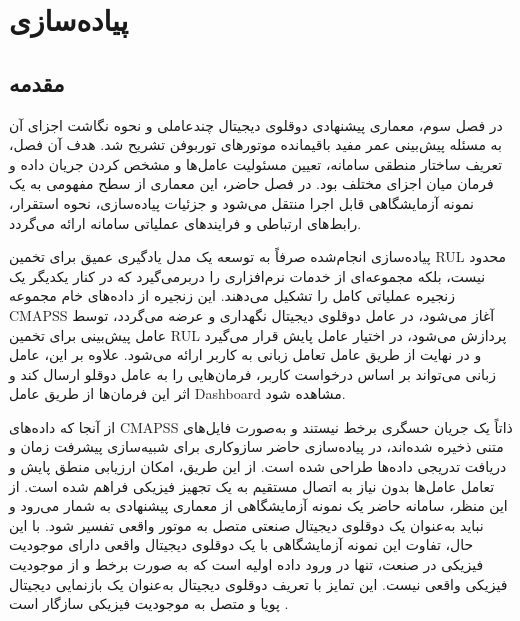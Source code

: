 
\chapter{پیاده‌سازی}\label{chap:impl}

\section{مقدمه}

در فصل سوم، معماری پیشنهادی دوقلوی دیجیتال چندعاملی و نحوه نگاشت اجزای آن به مسئله پیش‌بینی عمر مفید باقیمانده موتورهای توربوفن تشریح شد. هدف آن فصل، تعریف ساختار منطقی سامانه، تعیین مسئولیت عامل‌ها و مشخص کردن جریان داده و فرمان میان اجزای مختلف بود. در فصل حاضر، این معماری از سطح مفهومی به یک نمونه آزمایشگاهی قابل اجرا منتقل می‌شود و جزئیات پیاده‌سازی، نحوه استقرار، رابط‌های ارتباطی و فرایندهای عملیاتی سامانه ارائه می‌گردد.

پیاده‌سازی انجام‌شده صرفاً به توسعه یک مدل یادگیری عمیق برای تخمین \gls{RUL} محدود نیست، بلکه مجموعه‌ای از خدمات نرم‌افزاری را دربرمی‌گیرد که در کنار یکدیگر یک زنجیره عملیاتی کامل را تشکیل می‌دهند. این زنجیره از داده‌های خام مجموعه \gls{CMAPSS} آغاز می‌شود، در عامل دوقلوی دیجیتال نگهداری و عرضه می‌گردد، توسط عامل پیش‌بینی برای تخمین \gls{RUL} پردازش می‌شود، در اختیار عامل پایش قرار می‌گیرد و در نهایت از طریق عامل تعامل زبانی به کاربر ارائه می‌شود. علاوه بر این، عامل زبانی می‌تواند بر اساس درخواست کاربر، فرمان‌هایی را به عامل دوقلو ارسال کند و اثر این فرمان‌ها از طریق عامل \gls{Dashboard} مشاهده شود.

از آنجا که داده‌های \gls{CMAPSS} ذاتاً یک جریان حسگری برخط نیستند و به‌صورت فایل‌های متنی ذخیره شده‌اند، در پیاده‌سازی حاضر سازوکاری برای شبیه‌سازی پیشرفت زمان و دریافت تدریجی داده‌ها طراحی شده است. از این طریق، امکان ارزیابی منطق پایش و تعامل عامل‌ها بدون نیاز به اتصال مستقیم به یک تجهیز فیزیکی فراهم شده است. از این منظر، سامانه حاضر یک نمونه آزمایشگاهی از معماری پیشنهادی به شمار می‌رود و نباید به‌عنوان یک دوقلوی دیجیتال صنعتی متصل به موتور واقعی تفسیر شود. با این حال،‌ تفاوت این نمونه آزمایشگاهی با یک دوقلوی دیجیتال واقعی دارای موجودیت فیزیکی در صنعت، تنها در ورود داده اولیه است که به صورت برخط و از موجودیت فیزیکی واقعی نیست. این تمایز با تعریف دوقلوی دیجیتال به‌عنوان یک بازنمایی دیجیتال پویا و متصل به موجودیت فیزیکی سازگار است \cite{tao2018digital,qi2021enabling}.

